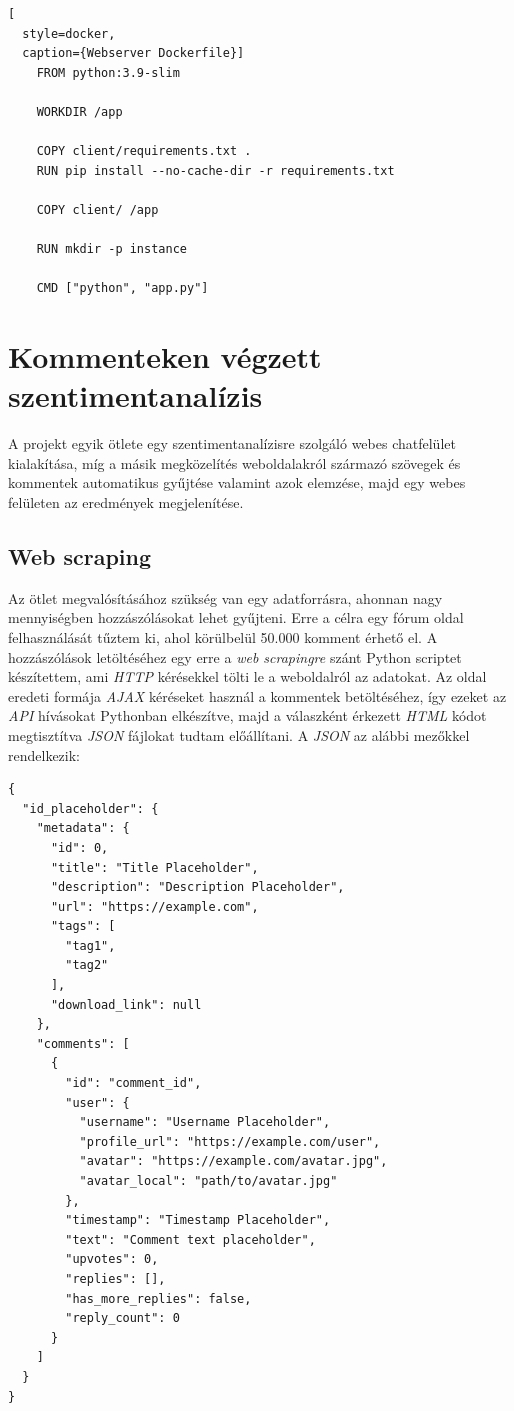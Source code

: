 \documentclass[12pt]{article}
\begin{document}
\begin{lstlisting}[
  style=docker,
  caption={Webserver Dockerfile}]
    FROM python:3.9-slim
    
    WORKDIR /app
    
    COPY client/requirements.txt .
    RUN pip install --no-cache-dir -r requirements.txt
    
    COPY client/ /app
    
    RUN mkdir -p instance
    
    CMD ["python", "app.py"]
\end{lstlisting}

\section{Kommenteken végzett szentimentanalízis}

A projekt egyik ötlete egy szentimentanalízisre szolgáló webes chatfelület kialakítása, míg a másik megközelítés weboldalakról származó szövegek és kommentek automatikus gyűjtése valamint azok elemzése, majd egy webes felületen az eredmények megjelenítése.

\subsection{Web scraping}

Az ötlet megvalósításához szükség van egy adatforrásra, ahonnan nagy mennyiségben hozzászólásokat lehet gyűjteni. Erre a célra egy fórum oldal felhasználását tűztem ki, ahol körülbelül 50.000 komment érhető el. A hozzászólások letöltéséhez egy erre a \textit{web scrapingre} szánt Python scriptet készítettem, ami \textit{HTTP} kérésekkel tölti le a weboldalról az adatokat. Az oldal eredeti formája \textit{AJAX} kéréseket használ a kommentek betöltéséhez, így ezeket az \textit{API} hívásokat Pythonban elkészítve, majd a válaszként érkezett \textit{HTML} kódot megtisztítva \textit{JSON} fájlokat tudtam előállítani. A \textit{JSON} az alábbi mezőkkel rendelkezik:

\begin{lstlisting}[style=docker]
  {
  "id_placeholder": {
    "metadata": {
      "id": 0,
      "title": "Title Placeholder",
      "description": "Description Placeholder",
      "url": "https://example.com",
      "tags": [
        "tag1",
        "tag2"
      ],
      "download_link": null
    },
    "comments": [
      {
        "id": "comment_id",
        "user": {
          "username": "Username Placeholder",
          "profile_url": "https://example.com/user",
          "avatar": "https://example.com/avatar.jpg",
          "avatar_local": "path/to/avatar.jpg"
        },
        "timestamp": "Timestamp Placeholder",
        "text": "Comment text placeholder",
        "upvotes": 0,
        "replies": [],
        "has_more_replies": false,
        "reply_count": 0
      }
    ]
  }
}
\end{lstlisting}
\end{document}
